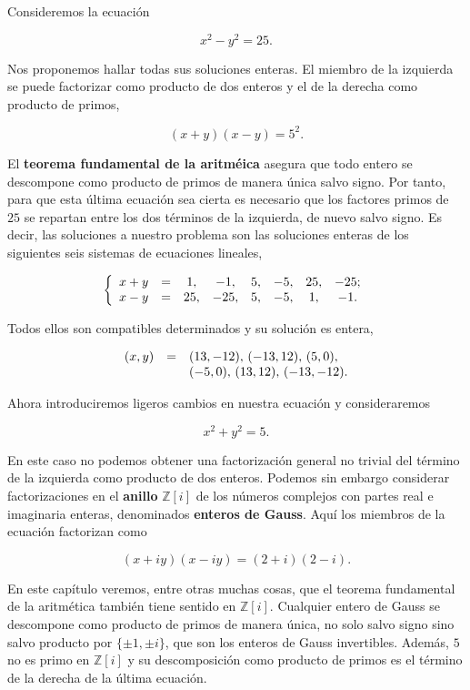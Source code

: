 
Consideremos la ecuación

\[x^2-y^2=25.\]

Nos proponemos hallar todas sus soluciones enteras. El miembro de la
izquierda se puede factorizar como producto de dos enteros y el de la
derecha como producto de primos,

\[(x+y)(x-y)=5^2.\]

El \textbf{teorema fundamental de la aritméica} asegura que todo entero
se descompone como producto de primos de manera única salvo signo. Por
tanto, para que esta última ecuación sea cierta es necesario que los
factores primos de \(25\) se repartan entre los dos términos de la
izquierda, de nuevo salvo signo. Es decir, las soluciones a nuestro
problema son las soluciones enteras de los siguientes seis sistemas de
ecuaciones lineales,

\[\left\{
\begin{array}{rccccccc}
x+y&=&1,&-1,&5,&-5,&25,&-25;\cr
x-y&=&25,&-25,&5,&-5,&1,&-1.
\end{array}
\right.\]

Todos ellos son compatibles determinados y su solución es entera,

\[\begin{array}{rcl}
(x,y)&=&(13,-12),\, (-13,12),\, (5,0),\cr 
&&(-5,0),\, (13,12),\, (-13,-12).
\end{array}\]

Ahora introduciremos ligeros cambios en nuestra ecuación y
consideraremos

\[x^2+y^2=5.\]

En este caso no podemos obtener una factorización general no trivial del
término de la izquierda como producto de dos enteros. Podemos sin
embargo considerar factorizaciones en el \textbf{anillo}
\(\mathbb Z[i]\) de los números complejos con partes real e imaginaria
enteras, denominados \textbf{enteros de Gauss}. Aquí los miembros de la
ecuación factorizan como

\[(x+iy)(x-iy)=(2+i)(2-i).\]

En este capítulo veremos, entre otras muchas cosas, que el teorema
fundamental de la aritmética también tiene sentido en \(\mathbb Z[i]\).
Cualquier entero de Gauss se descompone como producto de primos de
manera única, no solo salvo signo sino salvo producto por
\(\{\pm 1,\pm i\}\), que son los enteros de Gauss invertibles. Además,
\(5\) no es primo en \(\mathbb Z[i]\) y su descomposición como producto
de primos es el término de la derecha de la última ecuación.

